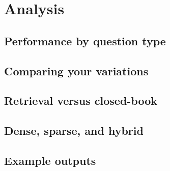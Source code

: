 \documentclass[11pt]{article}
\begin{document}

\section{Analysis}
\label{sec:analysis}

\subsection{Performance by question type}

\subsection{Comparing your variations}

\subsection{Retrieval versus closed-book}

\subsection{Dense, sparse, and hybrid}

\subsection{Example outputs}
\end{document}

